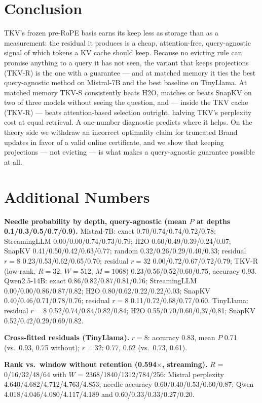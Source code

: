 \documentclass{article}
\begin{document}
\section{Conclusion}

TKV's frozen pre-RoPE basis earns its keep less as storage than as a
measurement: the residual it produces is a cheap, attention-free,
query-agnostic signal of which tokens a KV cache should keep. Because no
evicting rule can promise anything to a query it has not seen, the variant that
keeps projections (TKV-R) is the one with a guarantee --- and at matched memory
it ties the best query-agnostic method on Mistral-7B and the best baseline
on TinyLlama.
At matched memory TKV-S consistently beats H2O, matches or beats SnapKV on two
of three models without seeing the question, and --- inside the TKV cache
(TKV-R) --- beats attention-based selection outright, halving TKV's perplexity
cost at equal retrieval. A one-number diagnostic predicts
where it helps. On the theory side we withdraw an incorrect optimality claim for truncated
Brand updates in favor of a valid online certificate, and we show that keeping
projections --- not evicting --- is what makes a query-agnostic guarantee
possible at all.

\small



\appendix
\section{Additional Numbers}
\label{app:numbers}

\textbf{Needle probability by depth, query-agnostic (mean $P$ at depths
0.1/0.3/0.5/0.7/0.9).} Mistral-7B: exact 0.70/0.74/0.74/0.72/0.78;
StreamingLLM 0.00/0.00/0.74/0.73/0.79; H2O 0.60/0.49/0.39/0.24/0.07; SnapKV
0.41/0.50/0.42/0.63/0.77; random 0.32/0.26/0.29/0.40/0.33; residual $r{=}8$
0.23/0.53/0.62/0.65/0.70; residual $r{=}32$ 0.00/0.72/0.67/0.72/0.79; TKV-R
(low-rank, $R{=}32$, $W{=}512$, $M{=}1068$) 0.23/0.56/0.52/0.60/0.75, accuracy
0.93. Qwen2.5-14B: exact 0.86/0.82/0.87/0.81/0.76; StreamingLLM
0.00/0.00/0.86/0.87/0.82; H2O 0.80/0.62/0.22/0.22/0.03; SnapKV
0.40/0.46/0.71/0.78/0.76; residual $r{=}8$ 0.11/0.72/0.68/0.77/0.60.
TinyLlama: residual $r{=}8$ 0.52/0.74/0.84/0.82/0.84; H2O
0.55/0.70/0.60/0.37/0.81; SnapKV 0.52/0.42/0.29/0.69/0.82.

\textbf{Cross-fitted residuals (TinyLlama).} $r{=}8$: accuracy 0.83, mean $P$
0.71 (vs.\ 0.93, 0.75 without); $r{=}32$: 0.77, 0.62 (vs.\ 0.73, 0.61).

\textbf{Rank vs.\ window without retention (0.594$\times$, streaming).}
$R$ = 0/16/32/48/64 with $W$ = 2368/1840/1312/784/256: Mistral perplexity
4.640/4.682/4.712/4.763/4.853, needle accuracy 0.60/0.40/0.53/0.60/0.87; Qwen
4.018/4.046/4.080/4.117/4.189 and 0.60/0.33/0.33/0.27/0.20.
\end{document}
